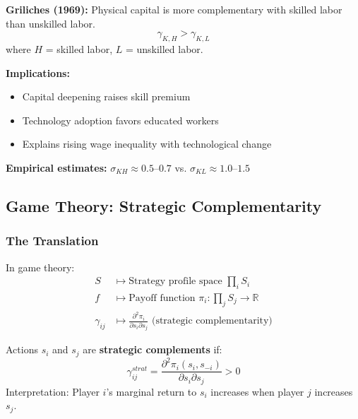 \begin{tcolorbox}[colback=green!5!white,colframe=green!75!black,title=\textbf{Classic Finding: Capital-Skill Complementarity}]
\textbf{Griliches (1969):} Physical capital is more complementary with skilled labor than unskilled labor.
\begin{equation}
\gamma_{K,H} > \gamma_{K,L}
\end{equation}
where $H$ = skilled labor, $L$ = unskilled labor.

\textbf{Implications:}
\begin{itemize}[noitemsep]
    \item Capital deepening raises skill premium
    \item Technology adoption favors educated workers
    \item Explains rising wage inequality with technological change
\end{itemize}

\textbf{Empirical estimates:} $\sigma_{KH} \approx 0.5$--$0.7$ vs. $\sigma_{KL} \approx 1.0$--$1.5$
\end{tcolorbox}

\subsection{Game Theory: Strategic Complementarity}

\subsubsection{The Translation}

\begin{axiom}
In game theory:
\begin{align}
S &\mapsto \text{Strategy profile space } \prod_{i} S_i \\
f &\mapsto \text{Payoff function } \pi_i: \prod_j S_j \to \mathbb{R} \\
\gamma_{ij} &\mapsto \frac{\partial^2 \pi_i}{\partial s_i \partial s_j} \text{ (strategic complementarity)}
\end{align}
\end{axiom}

\begin{definition}
Actions $s_i$ and $s_j$ are \textbf{strategic complements} if:
\begin{equation}
\gamma^{strat}_{ij} = \frac{\partial^2 \pi_i(s_i, s_{-i})}{\partial s_i \partial s_j} > 0
\end{equation}
Interpretation: Player $i$'s marginal return to $s_i$ increases when player $j$ increases $s_j$.
\end{definition}

